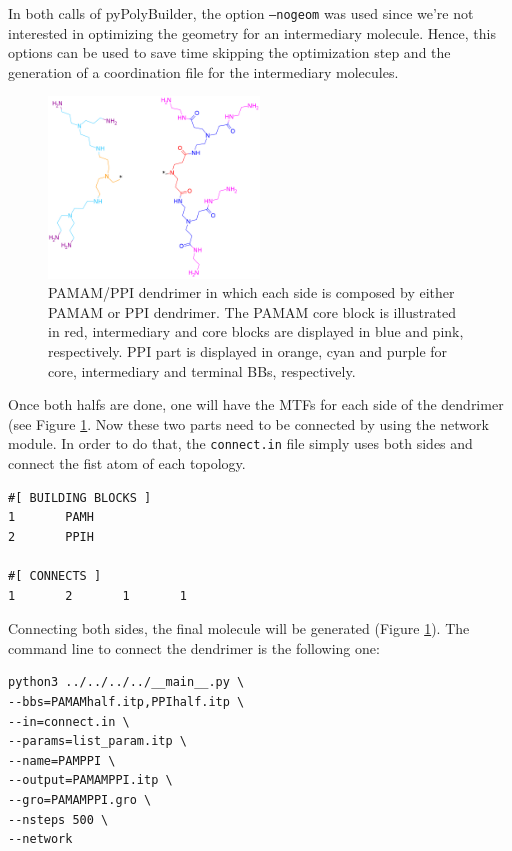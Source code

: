 In both calls of pyPolyBuilder, the option \texttt{--nogeom} was used since we're not interested in optimizing the geometry for an intermediary molecule. 
Hence, this options can be used to save time skipping the optimization step and the generation of a coordination file for the intermediary molecules.

\begin{figure}
    \centering
    \includegraphics[width=0.5\textwidth]{PAMAM_PPI-half/PAMAMPPIHalfs.png}
    \caption{PAMAM/PPI dendrimer in which each side is composed by either PAMAM or PPI dendrimer. The PAMAM core block is illustrated in red, intermediary and core blocks are displayed in blue and pink, respectively. PPI part is displayed in orange, cyan and purple for core, intermediary and terminal BBs, respectively. }
    \label{fig:HalfHalf}
\end{figure}

Once both halfs are done, one will have the MTFs for each side of the dendrimer (see Figure \ref{fig:HalfHalf}.
Now these two parts need to be connected by using the network module.
In order to do that, the \texttt{connect.in} file simply uses both sides and connect the fist atom of each topology.

\begin{lstlisting}
#[ BUILDING BLOCKS ]
1       PAMH
2       PPIH

#[ CONNECTS ]
1       2       1       1
\end{lstlisting}

Connecting both sides, the final molecule will be generated (Figure \ref{fig:HalfHalf}).
The command line to connect the dendrimer is the following one:

\begin{lstlisting}
python3 ../../../../__main__.py \
--bbs=PAMAMhalf.itp,PPIhalf.itp \
--in=connect.in \
--params=list_param.itp \
--name=PAMPPI \
--output=PAMAMPPI.itp \
--gro=PAMAMPPI.gro \
--nsteps 500 \
--network
\end{lstlisting}


